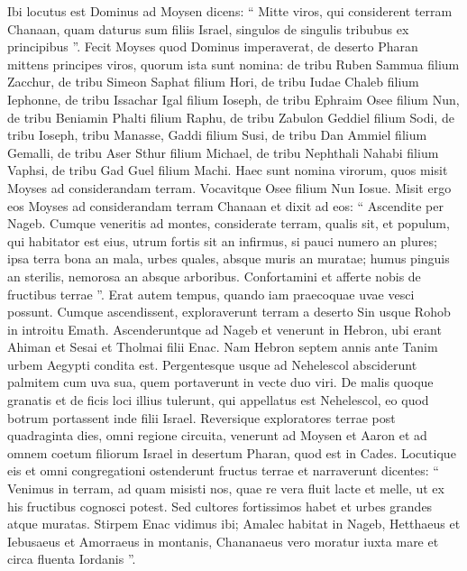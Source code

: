 \begin{biblechapter}
\begin{biblechapter}
\begin{biblechapter}
\begin{biblechapter}
\begin{biblechapter}
\begin{biblechapter}
\begin{biblechapter}
\begin{biblechapter}
\begin{biblechapter}
\begin{biblechapter}
\begin{biblechapter}
\begin{biblechapter}
\begin{biblechapter}
\verse Ibi locutus est Dominus ad Moysen dicens: 
\verse “ Mitte viros, qui considerent terram Chanaan, quam daturus sum filiis Israel, singulos de singulis tribubus ex principibus ”.
 \verse Fecit Moyses quod Dominus imperaverat, de deserto Pharan mittens principes viros, quorum ista sunt nomina: 
\verse de tribu Ruben Sammua filium Zacchur, 
 \verse de tribu Simeon Saphat filium Hori, 
\verse de tribu Iudae Chaleb filium Iephonne, 
\verse de tribu Issachar Igal filium Ioseph, 
\verse de tribu Ephraim Osee filium Nun, 
\verse de tribu Beniamin Phalti filium Raphu, 
\verse de tribu Zabulon Geddiel filium Sodi, 
\verse de tribu Ioseph, tribu Manasse, Gaddi filium Susi, 
\verse de tribu Dan Ammiel filium Gemalli, 
\verse de tribu Aser Sthur filium Michael, 
\verse de tribu Nephthali Nahabi filium Vaphsi, 
\verse de tribu Gad Guel filium Machi. 
\verse Haec sunt nomina virorum, quos misit Moyses ad considerandam terram. Vocavitque Osee filium Nun Iosue.
 \verse Misit ergo eos Moyses ad considerandam terram Chanaan et dixit ad eos: “ Ascendite per Nageb. Cumque veneritis ad montes, 
\verse considerate terram, qualis sit, et populum, qui habitator est eius, utrum fortis sit an infirmus, si pauci numero an plures; 
\verse ipsa terra bona an mala, urbes quales, absque muris an muratae; 
\verse humus pinguis an sterilis, nemorosa an absque arboribus. Confortamini et afferte nobis de fructibus terrae ”. Erat autem tempus, quando iam praecoquae uvae vesci possunt.
 \verse Cumque ascendissent, exploraverunt terram a deserto Sin usque Rohob in introitu Emath. 
\verse Ascenderuntque ad Nageb et venerunt in Hebron, ubi erant Ahiman et Sesai et Tholmai filii Enac. Nam Hebron septem annis ante Tanim urbem Aegypti condita est. 
\verse Pergentesque usque ad Nehelescol absciderunt palmitem cum uva sua, quem portaverunt in vecte duo viri. De malis quoque granatis et de ficis loci illius tulerunt, 
\verse qui appellatus est Nehelescol, eo quod botrum portassent inde filii Israel. 
\verse Reversique exploratores terrae post quadraginta dies, omni regione circuita, 
\verse venerunt ad Moysen et Aaron et ad omnem coetum filiorum Israel in desertum Pharan, quod est in Cades. Locutique eis et omni congregationi ostenderunt fructus terrae 
\verse et narraverunt dicentes: “ Venimus in terram, ad quam misisti nos, quae re vera fluit lacte et melle, ut ex his fructibus cognosci potest. 
\verse Sed cultores fortissimos habet et urbes grandes atque muratas. Stirpem Enac vidimus ibi; 
 \verse Amalec habitat in Nageb, Hetthaeus et Iebusaeus et Amorraeus in montanis, Chananaeus vero moratur iuxta mare et circa fluenta Iordanis ”.

\end{biblechapter}
\end{biblechapter}
\end{biblechapter}
\end{biblechapter}
\end{biblechapter}
\end{biblechapter}
\end{biblechapter}
\end{biblechapter}
\end{biblechapter}
\end{biblechapter}
\end{biblechapter}
\end{biblechapter}
\end{biblechapter}
